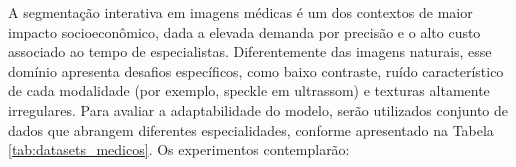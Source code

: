 A segmentação interativa em imagens médicas é um dos contextos de maior impacto socioeconômico, dada a elevada demanda por precisão e o alto custo associado ao tempo de especialistas. Diferentemente das imagens naturais, esse domínio apresenta desafios específicos, como baixo contraste, ruído característico de cada modalidade (por exemplo, speckle em ultrassom) e texturas altamente irregulares. Para avaliar a adaptabilidade do modelo, serão utilizados conjunto de dados que abrangem diferentes especialidades, conforme apresentado na Tabela \ref{tab:datasets_medicos}. Os experimentos contemplarão:



